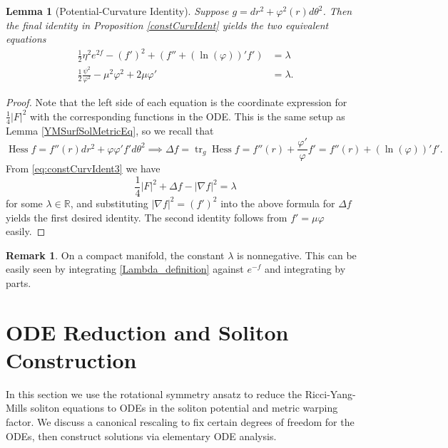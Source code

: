 \documentclass[12pt, a4paper, reqno, oneside]{amsart}
\newcommand{\R}{\mathbb{R}}
\renewcommand{\phi}{\varphi}
\DeclareMathOperator{\tr}{tr}
\DeclareMathOperator{\Hess}{Hess}
\numberwithin{equation}{section}
\theoremstyle{plain}
\newtheorem{lemma}[theorem]{Lemma}
\theoremstyle{definition}
\newtheorem{remark}[theorem]{Remark}
\theoremstyle{plain}
\begin{document}
\begin{lemma}[Potential-Curvature Identity]\label{potentCurvIdent}
  Suppose $g=dr^{2}+\phi^{2}(r)d\theta^{2}$. Then the final identity in Proposition \ref{constCurvIdent} yields the two equivalent equations
  \begin{align*}
    \frac{1}{2}\eta^2 e^{2f}-(f')^{2}+(f''+(\ln(\phi))'f') &= \lambda\\
    \frac{1}{2}\frac{\psi^2}{\phi^2}-\mu^{2}\phi^{2}+2\mu\phi' &= \lambda.
  \end{align*}
\end{lemma}
\begin{proof}
  Note that the left side of each equation is the coordinate expression for $\frac{1}{4}|F|^2$ with the corresponding functions in the ODE. This is the same setup as Lemma \ref{YMSurfSolMetricEq}, so we recall that 
  \[
    \Hess{f} = f''(r)dr^{2}+\phi\phi'f'd\theta^{2} \implies \Delta f = \tr_{g}\Hess{f} = f''(r)+\frac{\phi'}{\phi}f' = f''(r)+(\ln(\phi))'f'.
  \]
  From \eqref{eq:constCurvIdent3} we have
  \begin{equation}\label{Lambda_definition}
    \frac{1}{4}|F|^{2}+\Delta f-|\nabla f|^{2}=\lambda
  \end{equation}
  for some $\lambda\in\R$, and substituting $|\nabla f|^{2}=(f')^{2}$ into the above formula for $\Delta f$ yields the first desired identity. The second identity follows from $f'=\mu\phi$ easily.
\end{proof}

\begin{remark}
  On a compact manifold, the constant $\lambda$ is nonnegative. This can be easily seen by integrating \eqref{Lambda_definition} against $e^{-f}$ and integrating by parts.
\end{remark}

\section{ODE Reduction and Soliton Construction}
In this section we use the rotational symmetry ansatz to reduce the Ricci-Yang-Mills soliton equations to ODEs in the soliton potential and metric warping factor. We discuss a canonical rescaling to fix certain degrees of freedom for the ODEs, then construct solutions via elementary ODE analysis.
\end{document}
